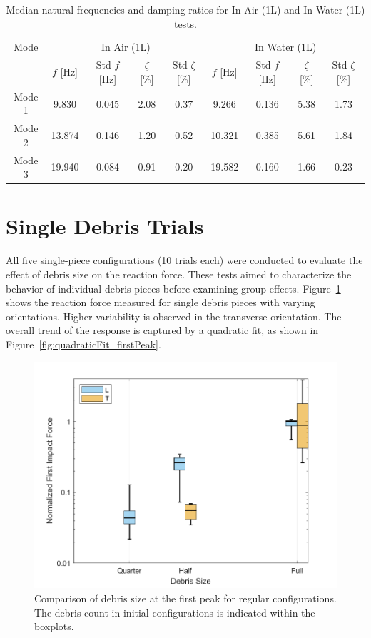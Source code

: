 \documentclass{article}
\begin{document}
{\begin{table}[ht]
\centering
\small
\begin{tabular}{c c c c c c c c c}
\hline
Mode & \multicolumn{4}{c}{In Air (1L)} & \multicolumn{4}{c}{In Water (1L)} \\
\cline{2-9}
 & $f$ [Hz] & Std $f$ [Hz] & $\zeta$ [\%] & Std $\zeta$ [\%] & $f$ [Hz] & Std $f$ [Hz] & $\zeta$ [\%] & Std $\zeta$ [\%] \\
\hline
Mode 1 & 9.830 & 0.045 & 2.08 & 0.37 & 9.266 & 0.136 & 5.38 & 1.73 \\
Mode 2 & 13.874 & 0.146 & 1.20 & 0.52 & 10.321 & 0.385 & 5.61 & 1.84 \\
Mode 3 & 19.940 & 0.084 & 0.91 & 0.20 & 19.582 & 0.160 & 1.66 & 0.23 \\
\hline
\end{tabular}

\caption{Median natural frequencies and damping ratios for In Air (1L) and In Water (1L) tests.}
\label{tab:mode_summary}
\end{table}
\section{Single Debris Trials} 

All five single-piece configurations (10 trials each) were conducted to evaluate the effect of debris size on the reaction force. These tests aimed to characterize the behavior of individual debris pieces before examining group effects. Figure~\ref{fig:firstpeak_regular} shows the reaction force measured for single debris pieces with varying orientations. Higher variability is observed in the transverse orientation. The overall trend of the response is captured by a quadratic fit, as shown in Figure~\ref{fig:quadraticFit_firstPeak}.

\begin{figure}[htbp]
    \centering
    \includegraphics[width=\textwidth]{FirstPeak_Regular_SplitByTrial_single.png}
    \caption{Comparison of debris size at the first peak for regular configurations. The debris count in initial configurations is indicated within the boxplots.}
    \label{fig:firstpeak_regular}
\end{figure}

}
\end{document}
